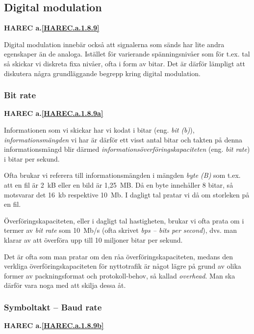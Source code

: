 \subsection{Digital modulation}
\textbf{HAREC a.\ref{HAREC.a.1.8.9}\label{myHAREC.a.1.8.9}}

Digital modulation innebär också att signalerna som sänds har lite andra
egenskaper än de analoga. Istället för varierande spänningsnivåer som för
t.ex. tal så skickar vi diskreta fixa nivåer, ofta i form av bitar. Det är
därför lämpligt att diskutera några grundläggande begrepp kring digital
modulation.

\subsubsection{Bit rate}
\textbf{HAREC a.\ref{HAREC.a.1.8.9a}\label{myHAREC.a.1.8.9a}}

Informationen som vi skickar har vi kodat i bitar (eng. \emph{bit (b)}),
\emph{informationsmängden} vi har är därför ett visst antal bitar och takten på
denna informationsmängd blir därmed \emph{informationsöverföringskapaciteten}
(eng. \emph{bit rate}) i bitar per sekund.

Ofta brukar vi referera till informationsmängden i mängden \emph{byte (B)}
som t.ex. att en fil är 2~kB eller en bild är 1,25~MB. Då en byte innehåller
8 bitar, så motsvarar det 16~kb respektive 10~Mb. I dagligt tal pratar vi då om
storleken på en fil.

Överföringskapaciteten, eller i dagligt tal hastigheten, brukar vi ofta prata
om i termer av \emph{bit rate} som 10~Mb/s (ofta skrivet \emph{bps -- bits per
second}), dvs. man klarar av att överföra upp till 10 miljoner bitar per sekund.

Det är ofta som man pratar om den råa överföringskapaciteten, medans den
verkliga överföringskapaciteten för nyttotrafik är något lägre på grund av
olika former av packningsformat och protokoll-behov, så kallad \emph{overhead}.
Man ska därför vara noga med att skilja dessa åt.

\subsubsection{Symboltakt -- Baud rate}
\textbf{HAREC a.\ref{HAREC.a.1.8.9b}\label{myHAREC.a.1.8.9b}}

